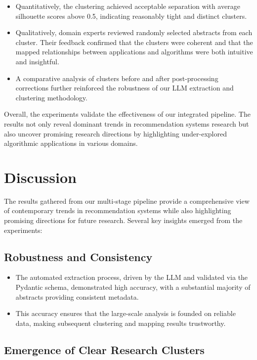 \documentclass[
	a4paper, %
	10pt, %
	unnumberedsections, %
	twoside, %
]{LTJournalArticle}
\begin{document}
\begin{itemize}
    \item Quantitatively, the clustering achieved acceptable separation with average silhouette scores above 0.5, indicating reasonably tight and distinct clusters.  
    \item Qualitatively, domain experts reviewed randomly selected abstracts from each cluster. Their feedback confirmed that the clusters were coherent and that the mapped relationships between applications and algorithms were both intuitive and insightful.  
    \item A comparative analysis of clusters before and after post-processing corrections further reinforced the robustness of our LLM extraction and clustering methodology.
\end{itemize}

Overall, the experiments validate the effectiveness of our integrated pipeline. The results not only reveal dominant trends in recommendation systems research but also uncover promising research directions by highlighting under-explored algorithmic applications in various domains.

\section{Discussion}

The results gathered from our multi-stage pipeline provide a comprehensive view of contemporary trends in recommendation systems while also highlighting promising directions for future research. Several key insights emerged from the experiments:

\subsection{Robustness and Consistency}

\begin{itemize}
    \item The automated extraction process, driven by the LLM and validated via the Pydantic schema, demonstrated high accuracy, with a substantial majority of abstracts providing consistent metadata.    
    \item This accuracy ensures that the large-scale analysis is founded on reliable data, making subsequent clustering and mapping results trustworthy.
\end{itemize}

\subsection{Emergence of Clear Research Clusters}
\end{document}
